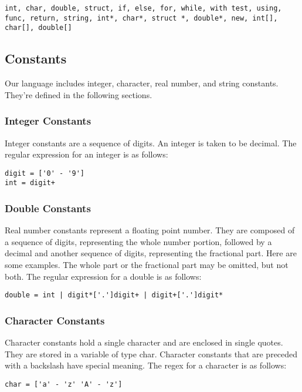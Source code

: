 \documentclass{article}
\begin{document}
\texttt{int, char, double, struct, if, else, for, while, with test, using, func, return, string, int*, char*, struct *, double*, new, int[], char[], double[]}

\subsection{Constants}
Our language includes integer, character, real number, and string constants. They're defined in the following sections.

\subsubsection{Integer Constants}
Integer constants are a sequence of digits. An integer is taken to be decimal. The regular expression for an integer is as follows:

\begin{Verbatim}[frame=single]
digit = ['0' - '9']
int = digit+
\end{Verbatim}

\subsubsection{Double Constants}
Real number constants represent a floating point number. They are composed of a sequence of digits, representing the whole number portion, followed by a decimal and another sequence of digits, representing the fractional part. Here are some examples. The whole part or the fractional part may be omitted, but not both.  The regular expression for a double is as follows:

\begin{Verbatim}[frame=single]
double = int | digit*['.']digit+ | digit+['.']digit*
\end{Verbatim}

\subsubsection{Character Constants}
Character constants hold a single character and are enclosed in single quotes. They are stored in a variable of type char. Character constants that are preceded with a backslash have special meaning. The regex for a character is as follows:

\begin{Verbatim}[frame=single]
char = ['a' - 'z' 'A' - 'z']
\end{Verbatim}
\end{document}
